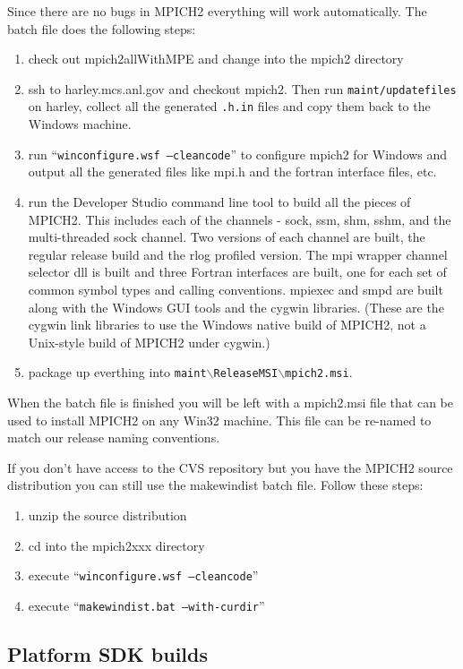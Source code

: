 \documentclass[dvipdfm,11pt]{article}
\begin{document}
Since there are no bugs in MPICH2 everything will work automatically.  The batch file does the
following steps:
\begin{enumerate}
\item check out mpich2allWithMPE and change into the mpich2 directory
\item ssh to harley.mcs.anl.gov and checkout mpich2.  Then run \texttt{maint/updatefiles} on
harley, collect all the generated \texttt{.h.in} files and copy them back to the Windows
machine.
\item run ``\texttt{winconfigure.wsf --cleancode}'' to configure mpich2 for Windows and output
all the generated files like mpi.h and the fortran interface files, etc.
\item run the Developer Studio command line tool to build all the pieces of MPICH2.  This
includes each of the channels - sock, ssm, shm, sshm, and the multi-threaded sock
channel.  Two versions of each channel are built, the regular release build and the rlog
profiled version.  The mpi wrapper channel selector dll is built and three Fortran interfaces
are built, one for each set of common symbol types and calling conventions.  mpiexec and
smpd are built along with the Windows GUI tools and the cygwin libraries.  (These are the cygwin
link libraries to use the Windows native build of MPICH2, not a Unix-style build of MPICH2
under cygwin.)
\item package up everthing into \texttt{maint$\backslash$ReleaseMSI$\backslash$mpich2.msi}.
\end{enumerate}

When the batch file is finished you will be left with a mpich2.msi file that can be used to
install MPICH2 on any Win32 machine.  This file can be re-named to match our release naming 
conventions.

If you don't have access to the CVS repository but you have the MPICH2 source
distribution you can still use the makewindist batch file.  Follow these steps:
\begin{enumerate}
\item unzip the source distribution
\item cd into the mpich2xxx directory
\item execute ``\texttt{winconfigure.wsf --cleancode}''
\item execute ``\texttt{makewindist.bat --with-curdir}''
\end{enumerate}

\subsection{Platform SDK builds}
\label{sec:psdk_build}
\end{document}
